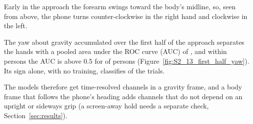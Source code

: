 Early in the approach the forearm swings toward the body's midline, so, seen from above, the phone turns
counter-clockwise in the right hand and clockwise in the left.

The yaw about gravity accumulated over the first half of the approach separates the hands with a pooled area under
the ROC curve (AUC) of , and within persons the AUC is above 0.5 for
 of  persons (Figure~\ref{fig:S2_13_first_half_yaw}).
Its sign alone, with no training, classifies  of the trials.

The models therefore get time-resolved channels in a gravity frame, and a body frame that follows the phone's
heading adds channels that do not depend on an upright or sideways grip (a screen-away hold needs a separate check,
Section~\ref{sec:results}).
